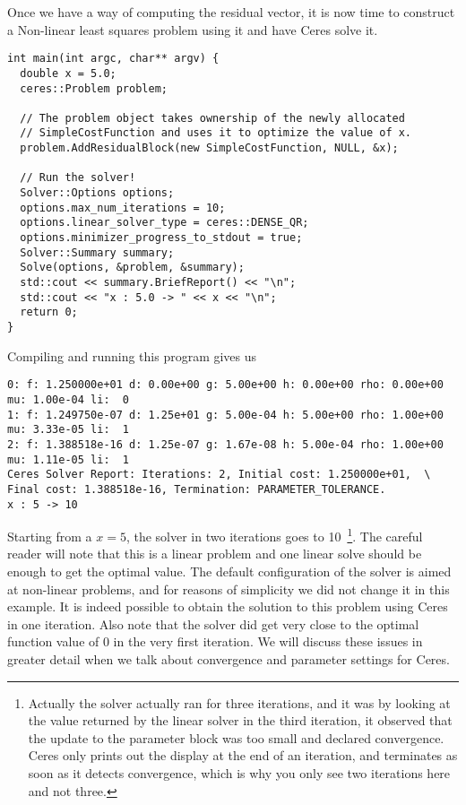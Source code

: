 Once we have a way of computing the residual vector, it is now time to construct a Non-linear least squares problem using it and have Ceres solve it.
\begin{verbatim}
int main(int argc, char** argv) {
  double x = 5.0;
  ceres::Problem problem;

  // The problem object takes ownership of the newly allocated
  // SimpleCostFunction and uses it to optimize the value of x.
  problem.AddResidualBlock(new SimpleCostFunction, NULL, &x);

  // Run the solver!
  Solver::Options options;
  options.max_num_iterations = 10;
  options.linear_solver_type = ceres::DENSE_QR;
  options.minimizer_progress_to_stdout = true;
  Solver::Summary summary;
  Solve(options, &problem, &summary);
  std::cout << summary.BriefReport() << "\n";
  std::cout << "x : 5.0 -> " << x << "\n";
  return 0;
}
\end{verbatim}

Compiling and running this program gives us
\begin{verbatim}
0: f: 1.250000e+01 d: 0.00e+00 g: 5.00e+00 h: 0.00e+00 rho: 0.00e+00 mu: 1.00e-04 li:  0
1: f: 1.249750e-07 d: 1.25e+01 g: 5.00e-04 h: 5.00e+00 rho: 1.00e+00 mu: 3.33e-05 li:  1
2: f: 1.388518e-16 d: 1.25e-07 g: 1.67e-08 h: 5.00e-04 rho: 1.00e+00 mu: 1.11e-05 li:  1
Ceres Solver Report: Iterations: 2, Initial cost: 1.250000e+01,  \
Final cost: 1.388518e-16, Termination: PARAMETER_TOLERANCE.
x : 5 -> 10
\end{verbatim}

Starting from a $x=5$, the solver in two iterations goes to 10~\footnote{Actually the solver actually ran for three iterations, and it was by looking at the value returned by the linear solver in the third iteration, it observed that the update to the parameter block was too small and declared convergence. Ceres only prints out the display at the end of an iteration, and terminates as soon as it detects convergence, which is why you only see two iterations here and not three.}. The careful reader will note that this is a linear problem and one linear solve should be enough to get the optimal value.  The default configuration of the solver is aimed at non-linear problems, and for reasons of simplicity we did not change it in this example. It is indeed possible to obtain the solution to this problem using Ceres in one iteration. Also note that the solver did get very close to the optimal function value of 0 in the very first iteration. We will discuss these issues in greater detail when we talk about convergence and parameter settings for Ceres.

